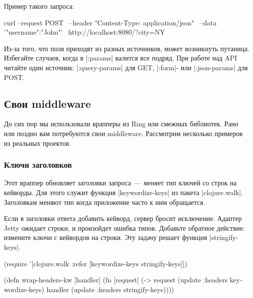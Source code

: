 \noindent
Пример такого запроса:

\begin{english}
  \begin{bash}
curl --request POST \
     --header "Content-Type: application/json" \
     --data '{"username":"John"}' \
     http://localhost:8080/?city=NY
  \end{bash}
\end{english}

Из-за того, что поля приходят из разных источников, может возникнуть
путаница. Избегайте случаев, когда в \spverb|:params| валится все подряд. При
работе над API читайте один источник: \spverb|:query-params| для GET,
\spverb|:form|- или \spverb|:json-params| для POST.


\subsection{Свои middleware}

До сих пор мы использовали врапперы из Ring или смежных библиотек. Рано или
поздно вам потребуются свои middleware. Рассмотрим несколько примеров из
реальных проектов.

\subsubsection*{Ключи заголовков}

Этот враппер обновляет заголовки запроса~--- меняет тип ключей со строк на
кейворды. Для этого служит функция \spverb|keywordize-keys| из пакета
\spverb|clojure.walk|. Заголовкам меняют тип когда приложение часто к ним
обращается.

Если в заголовки ответа добавить кейворд, сервер бросит исключение. Адаптер
Jetty ожидает строки, и произойдет ошибка типов. Добавьте обратное действие:
измените ключи с кейвордов на строки. Эту задачу решает функция
\spverb|stringify-keys|.

\begin{english}
  \begin{clojure}
(require '[clojure.walk :refer
           [keywordize-keys stringify-keys]])

(defn wrap-headers-kw [handler]
  (fn [request]
    (-> request
        (update :headers keywordize-keys)
        handler
        (update :headers stringify-keys))))
  \end{clojure}
\end{english}

